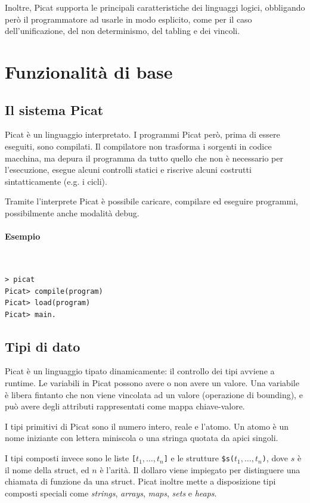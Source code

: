\documentclass[12pt,a4paper,openright]{book} %
\begin{document}
Inoltre, Picat supporta le principali caratteristiche dei linguaggi logici, obbligando però il programmatore ad usarle in modo esplicito, come per il caso dell'unificazione, del non determinismo, del tabling e dei vincoli.

\section{Funzionalità di base}
\label{sec:picat_base}

\subsection{Il sistema Picat}
\label{sec:picat_base_system}

Picat è un linguaggio interpretato. I programmi Picat però, prima di essere eseguiti, sono compilati. Il compilatore non trasforma i sorgenti in codice macchina, ma depura il programma da tutto quello che non è necessario per l'esecuzione, esegue alcuni controlli statici e riscrive alcuni costrutti sintatticamente (e.g. i cicli).

Tramite l'interprete Picat è possibile caricare, compilare ed eseguire programmi, possibilmente anche modalità debug.

\paragraph{Esempio}\
\begin{verbatim}
> picat
Picat> compile(program)
Picat> load(program)
Picat> main.
\end{verbatim}

\subsection{Tipi di dato}
\label{sec:picat_base_datatype}

Picat è un linguaggio tipato dinamicamente: il controllo dei tipi avviene a runtime. Le variabili in Picat possono avere o non avere un valore. Una variabile è libera fintanto che non viene vincolata ad un valore (operazione di bounding), e può avere degli attributi rappresentati come mappa chiave-valore.

I tipi primitivi di Picat sono il numero intero, reale e l'atomo. Un atomo è un nome iniziante con lettera miniscola o una stringa quotata da apici singoli.

I tipi composti invece sono le liste \verb|[|$t_1, \ldots, t_n$\verb|]| e le strutture \verb|$s(|$t_1, \ldots, t_n$\verb|)|, dove $s$ è il nome della struct, ed $n$ è l'arità. Il dollaro viene impiegato per distinguere una chiamata di funzione da una struct. Picat inoltre mette a disposizione tipi composti speciali come \emph{strings}, \emph{arrays}, \emph{maps}, \emph{sets} e \emph{heaps}.
\end{document}
